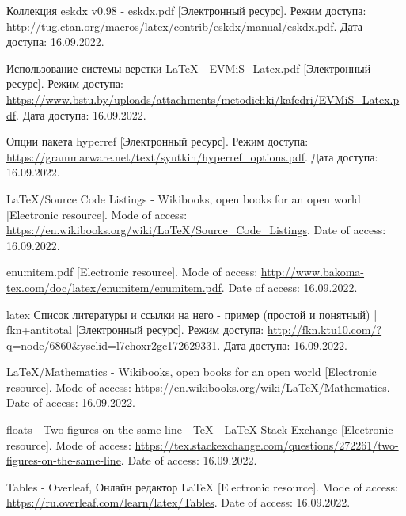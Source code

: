   \renewcommand{\addcontentsline}[3]{}%
  \renewcommand{\section}[2]{}%

  \begin{thebibliography}{}
    Коллекция eskdx v0.98 - eskdx.pdf
    [Электронный ресурс].
    Режим доступа: \url{http://tug.ctan.org/macros/latex/contrib/eskdx/manual/eskdx.pdf}.
    Дата доступа: 16.09.2022.
  
    Использование системы верстки LaTeX - EVMiS\_Latex.pdf
    [Электронный ресурс].
    Режим доступа: \url{https://www.bstu.by/uploads/attachments/metodichki/kafedri/EVMiS_Latex.pdf}.
    Дата доступа: 16.09.2022.
  
    Опции пакета hyperref
    [Электронный ресурс].
    Режим доступа: \url{https://grammarware.net/text/syutkin/hyperref_options.pdf}.
    Дата доступа: 16.09.2022.
  
    LaTeX/Source Code Listings - Wikibooks, open books for an open world
    [Electronic resource].
    Mode of access: \url{https://en.wikibooks.org/wiki/LaTeX/Source_Code_Listings}.
    Date of access: 16.09.2022.
  
    enumitem.pdf
    [Electronic resource].
    Mode of access: \url{http://www.bakoma-tex.com/doc/latex/enumitem/enumitem.pdf}.
    Date of access: 16.09.2022.
  
    latex Список литературы и ссылки на него - пример (простой и понятный) | fkn+antitotal
    [Электронный ресурс].
    Режим доступа: \url{http://fkn.ktu10.com/?q=node/6860&ysclid=l7choxr2gc172629331}.
    Дата доступа: 16.09.2022.

    LaTeX/Mathematics - Wikibooks, open books for an open world
    [Electronic resource].
    Mode of access: \url{https://en.wikibooks.org/wiki/LaTeX/Mathematics}.
    Date of access: 16.09.2022.

    floats - Two figures on the same line - TeX - LaTeX Stack Exchange
    [Electronic resource].
    Mode of access: \url{https://tex.stackexchange.com/questions/272261/two-figures-on-the-same-line}.
    Date of access: 16.09.2022.

    Tables - Overleaf, Онлайн редактор LaTeX
    [Electronic resource].
    Mode of access: \url{https://ru.overleaf.com/learn/latex/Tables}.
    Date of access: 16.09.2022.    
  \end{thebibliography}
\endgroup

\newpage
